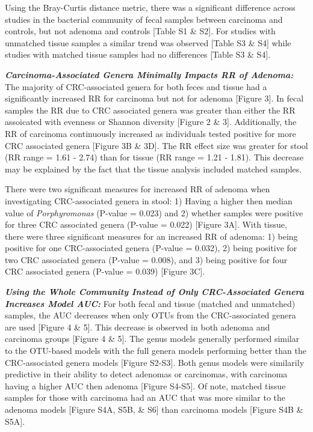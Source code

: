 \documentclass[12pt,]{article}
\begin{document}
Using the Bray-Curtis distance metric, there was a significant
difference across studies in the bacterial community of fecal samples
between carcinoma and controls, but not adenoma and controls {[}Table S1
\& S2{]}. For studies with unmatched tissue samples a similar trend was
observed {[}Table S3 \& S4{]} while studies with matched tissue samples
had no differences {[}Table S3 \& S4{]}.

\textbf{\emph{Carcinoma-Associated Genera Minimally Impacts RR of
Adenoma:}} The majority of CRC-associated genera for both feces and
tissue had a significantly increased RR for carcinoma but not for
adenoma {[}Figure 3{]}. In fecal samples the RR due to CRC associated
genera was greater than either the RR assoicated with evenness or
Shannon diversity {[}Figure 2 \& 3{]}. Additionally, the RR of carcinoma
continuously increased as individuals tested positive for more CRC
associated genera {[}Figure 3B \& 3D{]}. The RR effect size was greater
for stool (RR range = 1.61 - 2.74) than for tissue (RR range = 1.21 -
1.81). This decrease may be explained by the fact that the tissue
analysis included matched samples.

There were two significant measures for increased RR of adenoma when
investigating CRC-associated genera in stool: 1) Having a higher then
median value of \emph{Porphyromonas} (P-value = 0.023) and 2) whether
samples were positive for three CRC associated genera (P-value = 0.022)
{[}Figure 3A{]}. With tissue, there were three significant measures for
an increased RR of adenoma: 1) being positive for one CRC-associated
genera (P-value = 0.032), 2) being positive for two CRC associated
genera (P-value = 0.008), and 3) being positive for four CRC associated
genera (P-value = 0.039) {[}Figure 3C{]}.

\textbf{\emph{Using the Whole Community Instead of Only CRC-Associated
Genera Increases Model AUC:}} For both fecal and tissue (matched and
unmatched) samples, the AUC decreases when only OTUs from the
CRC-associated genera are used {[}Figure 4 \& 5{]}. This decrease is
observed in both adenoma and carcinoma groups {[}Figure 4 \& 5{]}. The
genus models generally performed similar to the OTU-based models with
the full genera models performing better than the CRC-associated genera
models {[}Figure S2-S3{]}. Both genus models were similarily predictive
in their ability to detect adenomas or carcinomas, with carcinoma having
a higher AUC then adenoma {[}Figure S4-S5{]}. Of note, matched tissue
samples for those with carcinoma had an AUC that was more similar to the
adenoma models {[}Figure S4A, S5B, \& S6{]} than carcinoma models
{[}Figure S4B \& S5A{]}.
\end{document}
